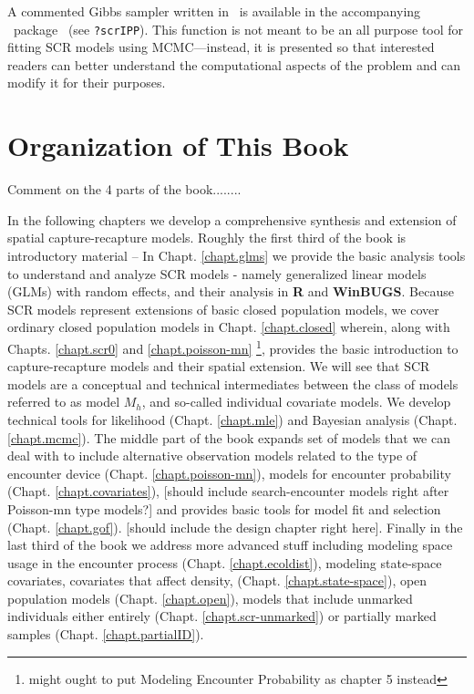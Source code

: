 A commented Gibbs sampler written
in \R~is available in the accompanying \R~package \scrbook~(see
\texttt{?scrIPP}). This function is not meant to be an all purpose
tool for fitting SCR models using MCMC---instead, it is presented so
that interested readers can better understand the computational
aspects of the problem and can modify it for their purposes.



\section{Organization of This Book}

Comment on the 4 parts of the book........

In the following chapters we develop a comprehensive synthesis and extension of
spatial capture-recapture models.
Roughly the first third of the book is introductory material --
In Chapt. \ref{chapt.glms} we provide the basic analysis tools to understand and
analyze SCR models - namely generalized linear models (GLMs) with random effects, and their
analysis in {\bf R} and {\bf WinBUGS}.  Because SCR models represent extensions of
basic closed population models, we cover ordinary closed population
models in Chapt. \ref{chapt.closed} wherein, along with Chapts. \ref{chapt.scr0} and \ref{chapt.poisson-mn}
\footnote{might ought to put Modeling Encounter Probability
  as chapter 5 instead}, provides the basic introduction
to capture-recapture models and their spatial extension.
We will see that
SCR models are a
conceptual and technical intermediates between the class of models referred to as
model $M_h$, and so-called
individual covariate models.
We develop technical tools for likelihood (Chapt. \ref{chapt.mle})
and Bayesian analysis (Chapt. \ref{chapt.mcmc}).
The middle part of the book expands set of models that we can deal with to include alternative
observation models related to the type of encounter device (Chapt. \ref{chapt.poisson-mn}), models for encounter probability
(Chapt. \ref{chapt.covariates}), [should include search-encounter
models right after Poisson-mn type models?] and provides basic tools
for model fit and selection (Chapt. \ref{chapt.gof}).
[should include the design chapter right here].
Finally in the last third of the book we address more advanced stuff including modeling
space usage in the encounter process (Chapt. \ref{chapt.ecoldist}), modeling state-space covariates, covariates
that affect density, (Chapt. \ref{chapt.state-space}), open population models (Chapt. \ref{chapt.open}),
models that include unmarked individuals either entirely (Chapt. \ref{chapt.scr-unmarked})
or partially marked samples (Chapt. \ref{chapt.partialID}).


